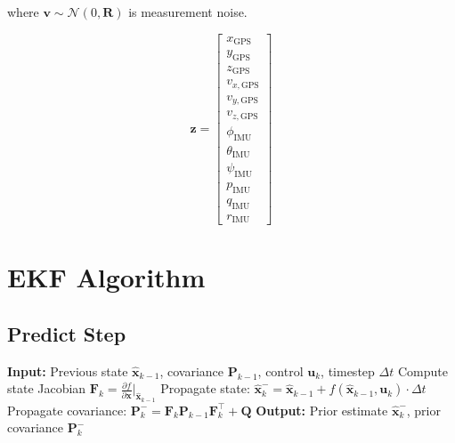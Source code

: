 where $\mathbf{v} \sim \mathcal{N}(0, \mathbf{R})$ is measurement noise.

\begin{equation}
    \mathbf{z} = \begin{bmatrix}
        x_{\text{GPS}} \\
        y_{\text{GPS}} \\
        z_{\text{GPS}} \\
        v_{x,\text{GPS}} \\
        v_{y,\text{GPS}} \\
        v_{z,\text{GPS}} \\
        \phi_{\text{IMU}} \\
        \theta_{\text{IMU}} \\
        \psi_{\text{IMU}} \\
        p_{\text{IMU}} \\
        q_{\text{IMU}} \\
        r_{\text{IMU}}
    \end{bmatrix}
\end{equation}

\section{EKF Algorithm}

\subsection{Predict Step}


\begin{algorithm}[H]
\caption{EKF Predict Step}
\begin{algorithmic}[1]
    \State \textbf{Input:} Previous state $\hat{\mathbf{x}}_{k-1}$, covariance $\mathbf{P}_{k-1}$, control $\mathbf{u}_k$, timestep $\Delta t$
    \State Compute state Jacobian $\mathbf{F}_k = \frac{\partial f}{\partial \mathbf{x}}\bigg|_{\hat{\mathbf{x}}_{k-1}}$
    \State Propagate state: $\hat{\mathbf{x}}_k^- = \hat{\mathbf{x}}_{k-1} + f(\hat{\mathbf{x}}_{k-1}, \mathbf{u}_k) \cdot \Delta t$
    \State Propagate covariance: $\mathbf{P}_k^- = \mathbf{F}_k \mathbf{P}_{k-1} \mathbf{F}_k^\top + \mathbf{Q}$
    \State \textbf{Output:} Prior estimate $\hat{\mathbf{x}}_k^-$, prior covariance $\mathbf{P}_k^-$
\end{algorithmic}
\end{algorithm}

